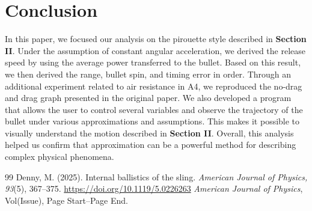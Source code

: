 \documentclass[11pt,letterpaper]{article}
\begin{document}
\section{Conclusion}
In this paper, we focused our analysis on the pirouette style described in \textbf{Section II}. Under the assumption of constant angular acceleration, we derived the release speed by using the average power transferred to the bullet. Based on this result, we then derived the range, bullet spin, and timing error in order. Through an additional experiment related to air resistance in A4, we reproduced the no-drag and drag graph presented in the original paper. We also developed a program that allows the user to control several variables and observe the trajectory of the bullet under various approximations and assumptions. This makes it possible to visually understand the motion described in \textbf{Section II}. Overall, this analysis helped us confirm that approximation can be a powerful method for describing complex physical phenomena.

\begin{thebibliography}{99}
Denny, M. (2025). Internal ballistics of the sling. \textit{American Journal of Physics, 93}(5), 367--375. \url{https://doi.org/10.1119/5.0226263}
\textit{American Journal of Physics}, Vol(Issue), Page Start--Page End.
\end{thebibliography}
\end{document}
